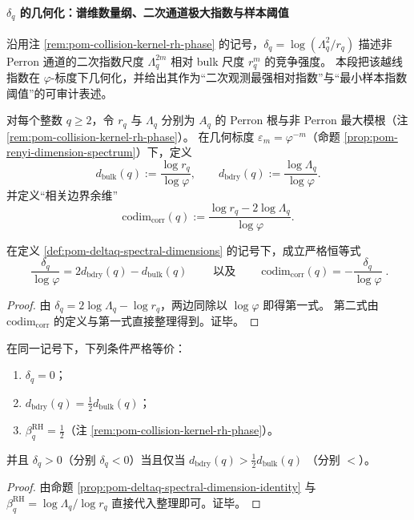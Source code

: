 
\paragraph{\texorpdfstring{$\delta_q$}{deltaq} 的几何化：谱维数量纲、二次通道极大指数与样本阈值}
沿用注 \ref{rem:pom-collision-kernel-rh-phase} 的记号，\(\delta_q=\log(\Lambda_q^2/r_q)\) 描述非 Perron 通道的二次指数尺度 \(\Lambda_q^{2m}\) 相对 bulk 尺度 \(r_q^{m}\) 的竞争强度。
本段把该越线指数在 \(\varphi\)-标度下几何化，并给出其作为“二次观测最强相对指数”与“最小样本指数阈值”的可审计表述。

\begin{definition}\label{def:pom-deltaq-spectral-dimensions}
对每个整数 \(q\ge 2\)，令 \(r_q\) 与 \(\Lambda_q\) 分别为 \(A_q\) 的 Perron 根与非 Perron 最大模根（注 \ref{rem:pom-collision-kernel-rh-phase}）。
在几何标度 \(\varepsilon_m=\varphi^{-m}\)（命题 \ref{prop:pom-renyi-dimension-spectrum}）下，定义
\[
d_{\mathrm{bulk}}(q):=\frac{\log r_q}{\log\varphi},\qquad
d_{\mathrm{bdry}}(q):=\frac{\log \Lambda_q}{\log\varphi}.
\]
并定义“相关边界余维”
\[
\mathrm{codim}_{\mathrm{corr}}(q):=\frac{\log r_q-2\log\Lambda_q}{\log\varphi}.
\]
\end{definition}

\begin{proposition}\label{prop:pom-deltaq-spectral-dimension-identity}
在定义 \ref{def:pom-deltaq-spectral-dimensions} 的记号下，成立严格恒等式
\[
\boxed{\;
\frac{\delta_q}{\log\varphi}
=2d_{\mathrm{bdry}}(q)-d_{\mathrm{bulk}}(q)
\;}
\qquad\text{以及}\qquad
\boxed{\;
\mathrm{codim}_{\mathrm{corr}}(q)=-\frac{\delta_q}{\log\varphi}\; }.
\]
\end{proposition}
\begin{proof}
由 \(\delta_q=2\log\Lambda_q-\log r_q\)，两边同除以 \(\log\varphi\) 即得第一式。
第二式由 \(\mathrm{codim}_{\mathrm{corr}}\) 的定义与第一式直接整理得到。证毕。
\end{proof}

\begin{corollary}[半阈值判据与越线相]\label{cor:pom-deltaq-half-threshold-criterion}
在同一记号下，下列条件严格等价：
\begin{enumerate}
  \item \(\delta_q=0\)；
  \item \(d_{\mathrm{bdry}}(q)=\tfrac12 d_{\mathrm{bulk}}(q)\)；
  \item \(\beta^{\mathrm{RH}}_q=\tfrac12\)（注 \ref{rem:pom-collision-kernel-rh-phase}）。
\end{enumerate}
并且 \(\delta_q>0\)（分别 \(\delta_q<0\)）当且仅当
\(
d_{\mathrm{bdry}}(q)>\tfrac12 d_{\mathrm{bulk}}(q)
\)
（分别 \(<\)）。
\end{corollary}
\begin{proof}
由命题 \ref{prop:pom-deltaq-spectral-dimension-identity} 与 \(\beta^{\mathrm{RH}}_q=\log\Lambda_q/\log r_q\) 直接代入整理即可。证毕。
\end{proof}

